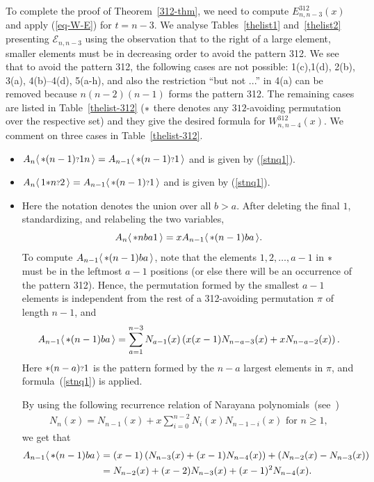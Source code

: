 \documentclass[11pt]{article}
\newcommand{\exactly}[2]{\ensuremath{\mathcal{E}_{#1,#2}}}
\newcommand{\st}{\mbox{\ensuremath{\ast}}}
\newcommand{\q}{\mbox{\ensuremath{\scriptstyle{?}}}}
\newcommand{\+}{\mbox{\ensuremath{\scriptstyle{+}}}}
\newcommand{\glob}[1]{\ensuremath{\langle\, #1\,\rangle}}
\begin{document}
To complete the proof of Theorem~\ref{312-thm}, we need to compute $E^{312}_{n,n-3}(x)$ and apply (\ref{eq-W-E}) for $t=n-3$. We analyse Tables~\ref{thelist1} and~\ref{thelist2} presenting $\exactly{n}{n-3}$ using the observation that to the right of a large element, smaller elements must be in decreasing order to avoid the pattern 312. We see that to avoid the pattern 312, the following cases are not possible: 1(c),1(d), 2(b), 3(a), 4(b)--4(d), 5(a-h), and also the restriction ``but not ...'' in 4(a) can be removed because $n(n-2)(n-1)$ forms the pattern 312. The remaining cases are listed in Table~\ref{thelist-312} ($\st$ there denotes any $312$-avoiding permutation over the respective set) and they give the desired formula for $W^{312}_{n,n-4}(x)$. We comment on three cases in Table~\ref{thelist-312}.
\begin{itemize}
	\item[1(b)]   {$A_n\glob{\st (n-1)\q 1n}=A_{n-1}\glob{\st (n-1)\q1}$} and is given by (\ref{stnq1}).
	\item[3(b)]   $A_n\glob{1\st n\q 2}=A_{n-1}\glob{\st (n-1)\q1}$ and is given by (\ref{stnq1}).
	\item[4(a)]  {Here the notation denotes the union over all $b>a$. After deleting the final $1$, standardizing, and relabeling the two variables,}
	\[
	{A_n\glob{\st nba1}=xA_{n-1}\glob{\st (n-1)ba}.}
	\]
	To compute $A_{n-1}\glob{\st (n-1)ba}$, note that the elements $1,2,\ldots,a-1$ in $\st$ must be in the leftmost $a-1$ positions (or else there will be an occurrence of the pattern 312). Hence, the permutation formed by the smallest $a-1$ elements is independent from the rest of a 312-avoiding permutation $\pi$ of length $n-1$, and
	\begingroup
	\begin{align*}
	A_{n-1}\glob{\st (n-1)ba}
	=\sum_{a=1}^{n-3}N_{a-1}(x)
	\left(x(x-1)N_{n-a-3}(x)+xN_{n-a-2}(x)\right).
	\end{align*}
	\endgroup
	Here $\st(n-a)\q1$ is the pattern formed by the $n-a$ largest elements in $\pi$, and formula~(\ref{stnq1}) is applied.

	      By using the following recurrence relation of Narayana polynomials~(see~\cite[Theorem 2.2]{Petersen2015})
	      \begin{align*}
		      {N_n(x)=N_{n-1}(x)+x\sum_{i=0}^{n-2}N_i(x)N_{n-1-i}(x)} \mbox{   for }  n \geq 1,
	      \end{align*}
	      we get that
	      \begin{align*}
		      A_{n-1}\glob{\st (n-1)ba}
		       & = {(x-1)\left( N_{n-3}(x) +(x-1)N_{n-4}(x)  \right)} +  \left( N_{n-2}(x)-N_{n-3}(x) \right) \\
		       & = N_{n-2}(x) + (x-2) N_{n-3}(x) +  (x-1)^2 N_{n-4}(x).
	      \end{align*}

\end{itemize}
\end{document}
